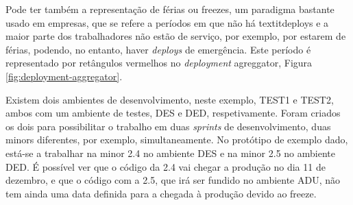             Pode ter também a representação de férias ou freezes, um paradigma bastante usado em empresas, que se refere a períodos em que não há textit{deploys} e a maior parte dos trabalhadores não estão de serviço, por exemplo, por estarem de férias, podendo, no entanto, haver \textit{deploys} de emergência. Este período é representado por retângulos vermelhos no \textit{deployment} agreggator, Figura \ref{fig:deployment-aggregator}.
            
            Existem dois ambientes de desenvolvimento, neste exemplo, TEST1 e TEST2, ambos com um ambiente de testes, DES e DED, respetivamente. Foram criados os dois para possibilitar o trabalho em duas \textit{sprints} de desenvolvimento, duas minors diferentes, por exemplo, simultaneamente. No protótipo de exemplo dado, está-se a trabalhar na minor 2.4 no ambiente DES e na minor 2.5 no ambiente DED. É possível ver que o código da 2.4 vai chegar a produção no dia 11 de dezembro, e que o código com a 2.5, que irá ser fundido no ambiente ADU, não tem ainda uma data definida para a chegada à produção devido ao freeze.

